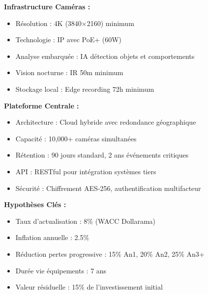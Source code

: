 \documentclass{dollarama}
\begin{document}
\clearpage



\begin{dollaramaappendices}

\textbf{Infrastructure Caméras :}
\begin{itemize}
    \item Résolution : 4K (3840×2160) minimum
    \item Technologie : IP avec PoE+ (60W)
    \item Analyse embarquée : IA détection objets et comportements
    \item Vision nocturne : IR 50m minimum
    \item Stockage local : Edge recording 72h minimum
\end{itemize}

\textbf{Plateforme Centrale :}
\begin{itemize}
    \item Architecture : Cloud hybride avec redondance géographique
    \item Capacité : 10,000+ caméras simultanées
    \item Rétention : 90 jours standard, 2 ans événements critiques
    \item API : RESTful pour intégration systèmes tiers
    \item Sécurité : Chiffrement AES-256, authentification multifacteur
\end{itemize}

\textbf{Hypothèses Clés :}
\begin{itemize}
    \item Taux d'actualisation : 8\% (WACC Dollarama)
    \item Inflation annuelle : 2.5\%
    \item Réduction pertes progressive : 15\% An1, 20\% An2, 25\% An3+
    \item Durée vie équipements : 7 ans
    \item Valeur résiduelle : 15\% de l'investissement initial
\end{itemize}


\end{dollaramaappendices}
\end{document}
